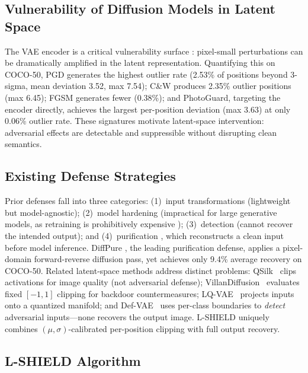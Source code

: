 \documentclass[conference]{IEEEtran}
\begin{document}
\subsection{Vulnerability of Diffusion Models in Latent Space}
\label{sec:vulnerability}

The VAE encoder is a critical vulnerability surface \cite{salman2023raising,
costa2024deep}: pixel-small perturbations can be dramatically amplified in the
latent representation. Quantifying this on COCO-50, PGD generates the
highest outlier rate (2.53\% of positions beyond 3-sigma, mean deviation 3.52,
max 7.54); C\&W produces 2.35\% outlier positions (max 6.45); FGSM generates
fewer (0.38\%); and PhotoGuard, targeting the encoder directly, achieves the
largest per-position deviation (max 3.63) at only 0.06\% outlier rate.
These signatures motivate latent-space intervention: adversarial effects are
detectable and suppressible without disrupting clean semantics.

\subsection{Existing Defense Strategies}

Prior defenses fall into three categories: (1)~input transformations
\cite{guo2018countering} (lightweight but model-agnostic); (2)~model
hardening \cite{madry2018towards,papernot2016distillation} (impractical for
large generative models, as retraining is prohibitively expensive
\cite{athalye2018obfuscated}); (3)~detection \cite{costa2024deep} (cannot
recover the intended output); and (4)~purification \cite{song2018pixeldefend,
nie2022diffusion}, which reconstructs a clean input before model inference.
DiffPure \cite{nie2022diffusion}, the leading purification defense, applies a
pixel-domain forward-reverse diffusion pass, yet achieves only 9.4\% average
recovery on COCO-50. Related latent-space methods address distinct problems:
QSilk~\cite{rychkovskiy2025qsilk} clips activations for image quality (not
adversarial defense); VillanDiffusion~\cite{chou2023villandiffusion} evaluates
fixed $[-1,1]$ clipping for backdoor countermeasures; LQ-VAE~\cite{kyatham2019variational}
projects inputs onto a quantized manifold; and Def-VAE~\cite{li2025defvae}
uses per-class boundaries to \emph{detect} adversarial inputs---none recovers
the output image. L-SHIELD uniquely combines $(\mu,\sigma)$-calibrated
per-position clipping with full output recovery.

\subsection{L-SHIELD Algorithm}
\end{document}
